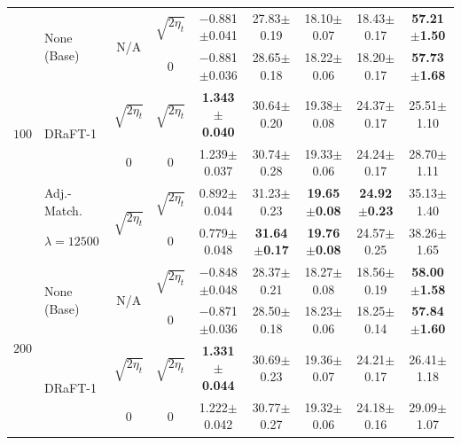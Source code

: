 \begin{table}[h!]
{\begin{tabular}{llccccccc}
    \midrule
    \multirow{6}{*}{$100$} & \multirow{2}{*}{None (Base)} & \multirow{2}{*}{N/A} & $\sqrt{2 \eta_t}$ & $-$0.881{\tiny$\pm$0.041} & 27.83{\tiny$\pm$0.19} & 18.10{\tiny$\pm$0.07} & 18.43{\tiny$\pm$0.17} & \textbf{57.21{\tiny$\pm$1.50}} \\
                         &        &                     & 0                 & $-$0.881{\tiny$\pm$0.036} & 28.65{\tiny$\pm$0.18} & 18.22{\tiny$\pm$0.06} & 18.20{\tiny$\pm$0.17} & \textbf{57.73{\tiny$\pm$1.68}} \\
    \addlinespace
     & \multirow{2}{*}{DRaFT-1}           & $\sqrt{2 \eta_t}$ & $\sqrt{2 \eta_t}$ & \textbf{1.343{\tiny$\pm$0.040}} & 30.64{\tiny$\pm$0.20} & 19.38{\tiny$\pm$0.08} & 24.37{\tiny$\pm$0.17} & 25.51{\tiny$\pm$1.10} \\
                                    &   & 0                 & 0                 & 1.239{\tiny$\pm$0.037} & 30.74{\tiny$\pm$0.28} & 19.33{\tiny$\pm$0.06} & 24.24{\tiny$\pm$0.17} & 28.70{\tiny$\pm$1.11} \\
    \addlinespace
     & Adj.-Match.  & \multirow{2}{*}{$\sqrt{2 \eta_t}$} & $\sqrt{2 \eta_t}$ & 0.892{\tiny$\pm$0.044} & 31.23{\tiny$\pm$0.23} & \textbf{19.65{\tiny$\pm$0.08}} & \textbf{24.92{\tiny$\pm$0.23}} & 35.13{\tiny$\pm$1.40} \\
     & $\lambda = 12500$                     &                                    & 0                 & 0.779{\tiny$\pm$0.048} & \textbf{31.64{\tiny$\pm$0.17}} & \textbf{19.76{\tiny$\pm$0.08}} & 24.57{\tiny$\pm$0.25} & 38.26{\tiny$\pm$1.65} \\
    \midrule
    \multirow{6}{*}{$200$} & \multirow{2}{*}{None (Base)} & \multirow{2}{*}{N/A} & $\sqrt{2 \eta_t}$ & $-$0.848{\tiny$\pm$0.048} & 28.37{\tiny$\pm$0.21} & 18.27{\tiny$\pm$0.08} & 18.56{\tiny$\pm$0.19} & \textbf{58.00{\tiny$\pm$1.58}} \\
                         &        &                     & 0                 & $-$0.871{\tiny$\pm$0.036} & 28.50{\tiny$\pm$0.18} & 18.23{\tiny$\pm$0.06} & 18.25{\tiny$\pm$0.14} & \textbf{57.84{\tiny$\pm$1.60}} \\
    \addlinespace
     & \multirow{2}{*}{DRaFT-1}           & $\sqrt{2 \eta_t}$ & $\sqrt{2 \eta_t}$ & \textbf{1.331{\tiny$\pm$0.044}} & 30.69{\tiny$\pm$0.23} & 19.36{\tiny$\pm$0.07} & 24.21{\tiny$\pm$0.17} & 26.41{\tiny$\pm$1.18} \\
                                    &   & 0                 & 0                 & 1.222{\tiny$\pm$0.042} & 30.77{\tiny$\pm$0.27} & 19.32{\tiny$\pm$0.06} & 24.18{\tiny$\pm$0.16} & 29.09{\tiny$\pm$1.07} \\

\end{tabular}}
\end{table}
